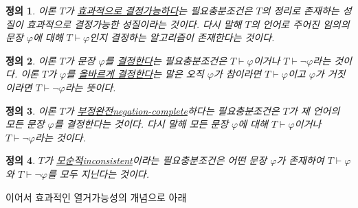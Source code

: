 \documentclass[a4paper,chapter,atbegshi]{oblivoir}
\newtheorem{defn}{정의}[chapter]
\begin{document}
\begin{defn}\label{defn:18}
  이론 $T$가 \underline{효과적으로 결정가능하다}는 필요충분조건은 $T$의 정리로
  존재하는 성질이 효과적으로 결정가능한 성질이라는 것이다. 다시 말해
  $T$의 언어로 주어진 임의의 문장 $\varphi$에 대해 $T\vdash\varphi$인지 결정하는
  알고리즘이 존재한다는 것이다.
\end{defn}
\begin{defn}\label{defn:19}
  이론 $T$가 문장 $\varphi$를 \underline{결정한다}는 필요충분조건은 
  $T\vdash\varphi$이거나 $T\vdash\neg\varphi$라는 것이다. 이론 $T$가
  $\varphi$를 \underline{올바르게 결정한다}는 말은 오직 $\varphi$가 참이라면
  $T\vdash\varphi$이고 $\varphi$가 거짓이라면 $T\vdash\neg\varphi$라는 뜻이다.
\end{defn}
\begin{defn}\label{defn:110}
  이론 $T$가 \underline{부정완전\tiny negation-complete}하다는 필요충분조건은
  $T$가 제 언어의 모든 문장 $\varphi$를 결정한다는 것이다. 다시 말해 모든 문장
  $\varphi$에 대해 $T\vdash\varphi$이거나 $T\vdash\neg\varphi$라는 것이다.
\end{defn}
\begin{defn}\label{defn:111}
  $T$가 \underline{모순적\tiny inconsistent}이라는 필요충분조건은 어떤 문장
  $\varphi$가 존재하여 $T\vdash\varphi$와 $T\vdash\neg\varphi$를 모두 지닌다는
  것이다.
\end{defn}
이어서 효과적인 열거가능성의 개념으로 아래 
\end{document}
